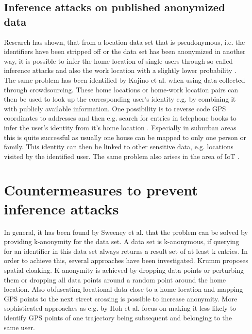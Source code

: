 \subsection{Inference attacks on published anonymized data}
Research has shown, that from a location data set that is pseudonymous, i.e. the identifiers have been stripped off or the data set has been anonymized in another way, it is possible to infer the home location of single users through so-called inference attacks \parencite{krumm, cellphone, privacy-home-work-pairs, hoh2006enhancing, twitter} and also the work location with a slightly lower probability \parencite{cellphone, privacy-home-work-pairs}. The same problem has been identified by Kajino et al. \parencite{crowdsourcing} when using data collected through crowdsourcing.
These home locations or home-work location pairs can then be used to look up the corresponding user's identity e.g. by combining it with publicly available information. One possibility is to reverse code GPS coordinates to addresses and then e.g. search for entries in telephone books to infer the user's identity from it's home location \parencite{krumm, privacy-home-work-pairs, hoh2006enhancing}. Especially in suburban areas this is quite successful as usually one house can be mapped to only one person or family. This identity can then be linked to other sensitive data, e.g. locations visited by the identified user. The same problem also arises in the area of IoT \parencite{iot, hoh2006enhancing}.

\section{Countermeasures to prevent inference attacks}
In general, it has been found by Sweeney et al. \parencite{k-anonymity} that the problem can be solved by providing k-anonymity for the data set. A data set is k-anonymous, if querying for an identifier in this data set always returns a result set of at least k entries.
In order to achieve this, several approaches have been investigated. Krumm \parencite{krumm} proposes spatial cloaking. K-anonymity is achieved by dropping data points or perturbing them or dropping all data points around a random point around the home location. Also obfuscating locational data close to a home location and mapping GPS points to the next street crossing is possible to increase anonymity.
More sophisticated approaches as e.g. by Hoh et al. \parencite{time-to-confusion} focus on making it less likely to identify GPS points of one trajectory being subsequent and belonging to the same user.

